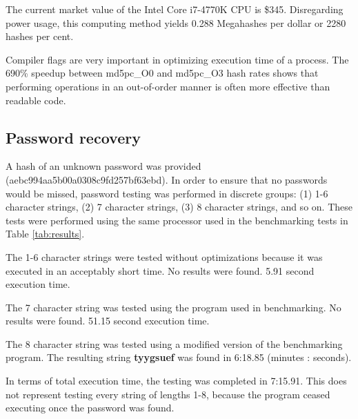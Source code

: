 		The current market value of the Intel Core i7-4770K CPU is \$345. Disregarding power usage, this computing method yields 0.288 Megahashes per dollar or 2280 hashes per cent. 

		Compiler flags are very important in optimizing execution time of a process. The 690\% speedup between md5pc\_O0 and md5pc\_O3 hash rates shows that performing operations in an out-of-order manner is often more effective than readable code. 


	\subsection{Password recovery}
		A hash of an unknown password was provided (aebc994aa5b00a0308c9fd257bf63ebd). In order to ensure that no passwords would be missed, password testing was performed in discrete groups: (1) 1-6 character strings, (2) 7 character strings, (3) 8 character strings, and so on. These tests were performed using the same processor used in the benchmarking tests in Table \ref{tab:results}. 

		The 1-6 character strings were tested without optimizations because it was executed in an acceptably short time. No results were found. 5.91 second execution time. 

		The 7 character string was tested using the program used in benchmarking. No results were found. 51.15 second execution time.

		The 8 character string was tested using a modified version of the benchmarking program. The resulting string \textbf{tyygsuef} was found in 6:18.85 (minutes : seconds). 

		In terms of total execution time, the testing was completed in 7:15.91. This does not represent testing every string of lengths 1-8, because the program ceased executing once the password was found. 